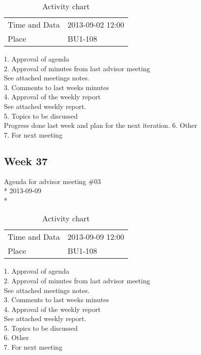 \begin{table}[H]
\begin{center}
\begin{tabular}{ l | l }
Time and Data & 2013-09-02 12:00 \\
Place & BU1-108 \\
\end{tabular}
\end{center}
\caption{Activity chart}
\label{table:activityChartAdvisorAgendaWeek36}
\end{table}


1. Approval of agenda \\
2. Approval of minutes from last advisor meeting \\
See attached meetings notes. \\
3. Comments to last weeks minutes \\
4. Approval of the weekly report \\
See attached weekly report. \\
5. Topics to be discussed \\
Progress done last week and plan for the next iteration.
6. Other \\
7. For next meeting \\

\iffalse
\newpage
\subsection{Week 37}

\begin{center}
Agenda for advisor meeting \#03\\*
2013-09-09\\*
\end{center}

\begin{table}[H]
\begin{center}
\begin{tabular}{ l | l }
Time and Data & 2013-09-09 12:00 \\
Place & BU1-108 \\
\end{tabular}
\end{center}
\caption{Activity chart}
\label{table:activityChartAdvisorAgendaWeek37}
\end{table}

1. Approval of agenda \\
2. Approval of minutes from last advisor meeting \\
See attached meetings notes.  \\
3. Comments to last weeks minutes \\
4. Approval of the weekly report \\
See attached weekly report. \\
5. Topics to be discussed \\
6. Other \\
7. For next meeting \\

